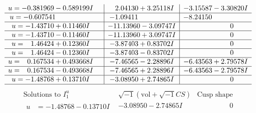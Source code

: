 \documentclass[1p]{elsarticle_modified}
\theoremstyle{definition}
\newcommand{\I}{\sqrt{-1}}
\begin{document}
$$\begin{array}{c|c|c}
\begin{aligned}
u &= -0.381969 - 0.589199 I\end{aligned}
 & \phantom{-}2.04130 + 3.25118 I & -3.15587 - 3.30820 I \\ \hline\begin{aligned}
u &= -0.607541\phantom{ +0.000000I}\end{aligned}
 & -1.09411\phantom{ +0.000000I} & -8.24150\phantom{ +0.000000I} \\ \hline\begin{aligned}
u &= -1.43710 + 0.11460 I\end{aligned}
 & -11.13960 - 3.09747 I & \phantom{-0.000000 } 0 \\ \hline\begin{aligned}
u &= -1.43710 - 0.11460 I\end{aligned}
 & -11.13960 + 3.09747 I & \phantom{-0.000000 } 0 \\ \hline\begin{aligned}
u &= \phantom{-}1.46424 + 0.12360 I\end{aligned}
 & -3.87403 + 0.83702 I & \phantom{-0.000000 } 0 \\ \hline\begin{aligned}
u &= \phantom{-}1.46424 - 0.12360 I\end{aligned}
 & -3.87403 - 0.83702 I & \phantom{-0.000000 } 0 \\ \hline\begin{aligned}
u &= \phantom{-}0.167534 + 0.493668 I\end{aligned}
 & -7.46565 - 2.28896 I & -6.43563 + 2.79578 I \\ \hline\begin{aligned}
u &= \phantom{-}0.167534 - 0.493668 I\end{aligned}
 & -7.46565 + 2.28896 I & -6.43563 - 2.79578 I \\ \hline\begin{aligned}
u &= -1.48768 + 0.13710 I\end{aligned}
 & -3.08950 + 2.74865 I & \phantom{-0.000000 } 0\\
 \hline 
 \end{array}$$\newpage$$\begin{array}{c|c|c}  
\text{Solutions to }I^u_{1}& \I (\text{vol} + \sqrt{-1}CS) & \text{Cusp shape}\\
 \hline 
\begin{aligned}
u &= -1.48768 - 0.13710 I\end{aligned}
 & -3.08950 - 2.74865 I & \phantom{-0.000000 } 0 \\ \hline\begin{aligned}

\end{aligned}
\end{array}$$
\end{document}
